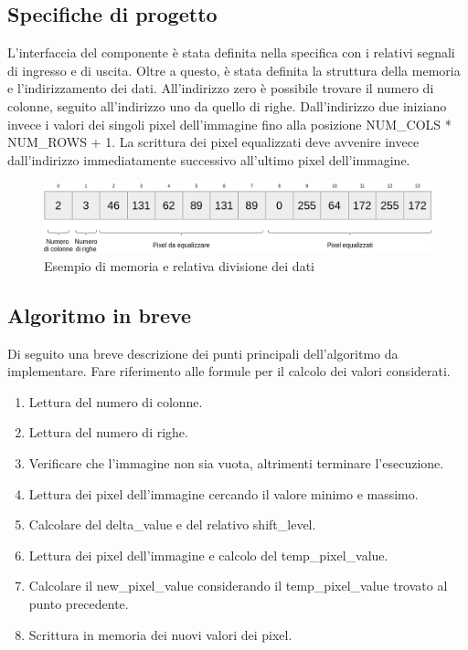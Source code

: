 \documentclass{article}
\begin{document}
\subsection{Specifiche di progetto}
L'interfaccia del componente è stata definita nella specifica con i relativi segnali di ingresso e di uscita. Oltre a questo, è stata definita la struttura della memoria e l'indirizzamento dei dati. All'indirizzo zero è possibile trovare il numero di colonne, seguito all'indirizzo uno da quello di righe. Dall'indirizzo due iniziano invece i valori dei singoli pixel dell'immagine fino alla posizione NUM\_COLS * NUM\_ROWS + 1. La scrittura dei pixel equalizzati deve avvenire invece dall'indirizzo immediatamente successivo all'ultimo pixel dell'immagine.

\begin{figure}[h]
    \includegraphics[width=\textwidth]{memory.png}
    \centering
    \caption{Esempio di memoria e relativa divisione dei dati}
\end{figure}

\pagebreak

\subsection{Algoritmo in breve}
Di seguito una breve descrizione dei punti principali dell'algoritmo da implementare. Fare riferimento alle formule per il calcolo dei valori considerati.

\begin{enumerate}
    \item Lettura del numero di colonne.
    \item Lettura del numero di righe.
    \item Verificare che l'immagine non sia vuota, altrimenti terminare l'esecuzione.
    \item Lettura dei pixel dell'immagine cercando il valore minimo e massimo.
    \item Calcolare del delta\_value e del relativo shift\_level.
    \item Lettura dei pixel dell'immagine e calcolo del temp\_pixel\_value.
    \item Calcolare il new\_pixel\_value considerando il temp\_pixel\_value trovato al punto precedente.
    \item Scrittura in memoria dei nuovi valori dei pixel.
\end{enumerate}
\end{document}
